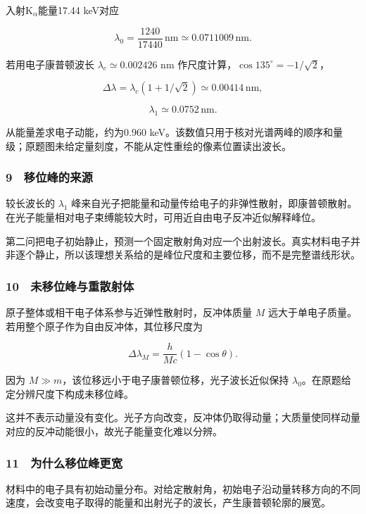 \documentclass[12pt,a4paper,fontset=fandol]{ctexart}
\begin{document}
入射K\(_\alpha\)能量17.44 keV对应

\[\lambda_0=\frac{1240}{17440}\,\mathrm{nm}
\simeq0.0711009\,\mathrm{nm}.\]

若用电子康普顿波长 \(\lambda_c\simeq0.002426\) nm
作尺度计算，\(\cos135^\circ=-1/\sqrt2\)，

\[\Delta\lambda=\lambda_c(1+1/\sqrt2)
\simeq0.00414\,\mathrm{nm},\]

\[\lambda_1\simeq0.0752\,\mathrm{nm}.\]

从能量差求电子动能，约为0.960
keV。该数值只用于核对光谱两峰的顺序和量级；原题图未给定量刻度，不能从定性重绘的像素位置读出波长。

\subsubsection{9　移位峰的来源}\label{ux79fbux4f4dux5cf0ux7684ux6765ux6e90}

较长波长的 \(\lambda_1\)
峰来自光子把能量和动量传给电子的非弹性散射，即康普顿散射。在光子能量相对电子束缚能较大时，可用近自由电子反冲近似解释峰位。

第二问把电子初始静止，预测一个固定散射角对应一个出射波长。真实材料电子并非逐个静止，所以该理想关系给的是峰位尺度和主要位移，而不是完整谱线形状。

\subsubsection{10　未移位峰与重散射体}\label{ux672aux79fbux4f4dux5cf0ux4e0eux91cdux6563ux5c04ux4f53}

原子整体或相干电子体系参与近弹性散射时，反冲体质量 \(M\)
远大于单电子质量。若用整个原子作为自由反冲体，其位移尺度为

\[\Delta\lambda_M=\frac h{Mc}(1-\cos\theta).\]

因为 \(M\gg m\)，该位移远小于电子康普顿位移，光子波长近似保持
\(\lambda_0\)。在原题给定分辨尺度下构成未移位峰。

这并不表示动量没有变化。光子方向改变，反冲体仍取得动量；大质量使同样动量对应的反冲动能很小，故光子能量变化难以分辨。

\subsubsection{11　为什么移位峰更宽}\label{ux4e3aux4ec0ux4e48ux79fbux4f4dux5cf0ux66f4ux5bbd}

材料中的电子具有初始动量分布。对给定散射角，初始电子沿动量转移方向的不同速度，会改变电子取得的能量和出射光子的波长，产生康普顿轮廓的展宽。
\end{document}
